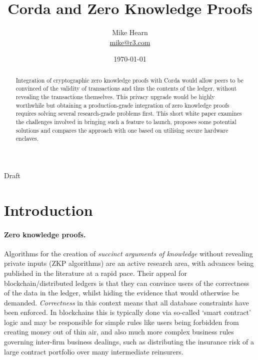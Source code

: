 \documentclass{article}
\author{Mike Hearn \\ \href{mailto:mike@r3.com}{mike@r3.com}}
\date{\today}
\title{Corda and Zero Knowledge Proofs}
\begin{document}
\maketitle
\begin{center}
Draft
\end{center}

\vspace{10mm}

\begin{abstract}

Integration of cryptographic zero knowledge proofs with Corda would allow peers to be
convinced of the validity of transactions and thus the contents of the ledger, without revealing the transactions
themselves. This privacy upgrade would be highly worthwhile but obtaining a production-grade
integration of zero knowledge proofs requires solving several research-grade problems first. This short
white paper examines the challenges involved in bringing such a feature to launch, proposes some potential
solutions and compares the approach with one based on utilising secure hardware enclaves.

\end{abstract}
\vfill

\newpage
\tableofcontents
\newpage
\section{Introduction}

\paragraph{Zero knowledge proofs.}Algorithms for the creation of \emph{succinct arguments of knowledge} without
revealing private inputs (ZKP algorithms) are an active research area, with advances being published in the
literature at a rapid pace. Their appeal for blockchain/distributed ledgers is that they can convince
users of the correctness of the data in the ledger, whilst hiding the evidence that would otherwise be demanded.
\emph{Correctness} in this context means that all database constraints have been enforced. In blockchains this
is typically done via so-called `smart contract' logic and may be responsible for simple rules
like users being forbidden from creating money out of thin air, and also much more complex business rules
governing inter-firm business dealings, such as distributing the insurance risk of a large contract
portfolio over many intermediate reinsurers.
\end{document}
